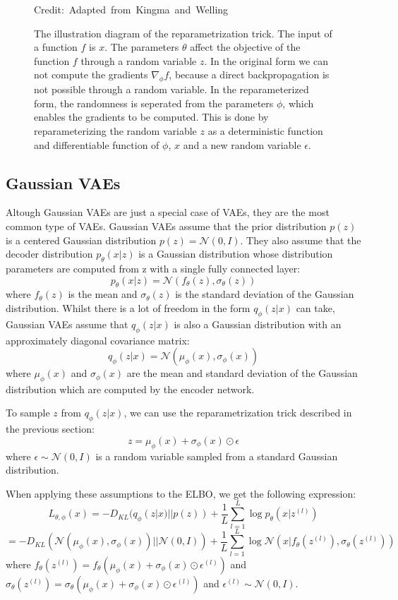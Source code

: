 \begin{figure}
    \caption{The illustration diagram of the reparametrization trick. The input of a function $f$ is $x$. The parameters $\theta$ affect the objective of the function $f$ through a random variable $z$. In the original form we can not compute the gradients $\nabla_{\phi} f$, because a direct backpropagation is not possible through a random variable. In the reparameterized form, the randomness is seperated from the parameters $\phi$, which enables the gradients to be computed. This is done by reparameterizing the random variable $z$ as a deterministic function and differentiable function  of $\phi$, $x$ and a new random variable $\epsilon$.\cite{Kingma_2019}}

    \hspace*{15pt}\hbox{\scriptsize Credit: Adapted from Kingma and Welling\cite{Kingma_2019}  }

\end{figure}


\subsection{Gaussian VAEs}

Altough Gaussian VAEs are just a special case of VAEs, they are the most common type of VAEs. Gaussian VAEs assume that the prior distribution $p(z)$ is a centered Gaussian distribution $ p(z) = \mathcal{N}(0, I)$. They also assume that the decoder distribution $p_{\theta}(x|z)$ is a Gaussian distribution whose distribution parameters are computed from z with a single fully connected layer: 
\[ p_{\theta}(x|z) = \mathcal{N}(f_{\theta}(z), \sigma_{\theta}(z)) \]
where $f_{\theta}(z)$ is the mean and $\sigma_{\theta}(z)$ is the standard deviation of the Gaussian distribution. Whilst there is a lot of freedom in the form $q_{\phi}(z|x)$ can take, Gaussian VAEs assume that $q_{\phi}(z|x)$ is also a Gaussian distribution with an approximately diagonal covariance matrix: 
\[ q_{\phi}(z|x) = \mathcal{N}(\mu_{\phi}(x), \sigma_{\phi}(x)) \]
where $\mu_{\phi}(x)$ and $\sigma_{\phi}(x)$ are the mean and standard deviation of the Gaussian distribution which are computed by the encoder network.

To sample $z$ from $q_{\phi}(z|x)$, we can use the reparametrization trick described in the previous section: \[ z = \mu_{\phi}(x) + \sigma_{\phi}(x) \odot \epsilon \] where $\epsilon \sim \mathcal{N}(0, I)$ is a random variable sampled from a standard Gaussian distribution.

When applying these assumptions to the ELBO, we get the following expression: \[ L_{\theta, \phi}(x) = - D_{KL}(q_{\phi}(z|x) || p(z)) + \frac{1}{L} \sum_{l=1}^{L} \log p_{\theta}(x|z^{(l)}) \]
\[ = - D_{KL}(\mathcal{N}(\mu_{\phi}(x), \sigma_{\phi}(x)) || \mathcal{N}(0, I)) + \frac{1}{L} \sum_{l=1}^{L} \log \mathcal{N}(x|f_{\theta}(z^{(l)}), \sigma_{\theta}(z^{(l)})) \]
where $f_{\theta}(z^{(l)}) = f_{\theta}(\mu_{\phi}(x) + \sigma_{\phi}(x) \odot \epsilon^{(l)})$ and $\sigma_{\theta}(z^{(l)}) = \sigma_{\theta}(\mu_{\phi}(x) + \sigma_{\phi}(x) \odot \epsilon^{(l)})$ and $\epsilon^{(l)} \sim \mathcal{N}(0, I)$.

